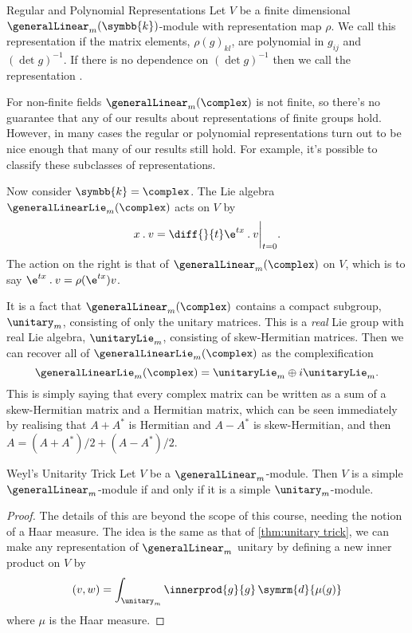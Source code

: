 \documentclass[fleqn]{NotesClass}
\renewcommand{\field}{\symbb{k}}
\newcommand{\action}{\mathbin{.}}
\renewcommand{\dd}{\,\symrm{d}}
\begin{document}
    \begin{dfn}{Regular and Polynomial Representations}{}
        Let \(V\) be a finite dimensional \(\generalLinear_m(\field)\)-module with representation map \(\rho\).
        We call this representation  if the matrix elements, \(\rho(g)_{kl}\), are polynomial in \(g_{ij}\) and \((\det g)^{-1}\).
        If there is no dependence on \((\det g)^{-1}\) then we call the representation .
    \end{dfn}
    
    For non-finite fields \(\generalLinear_m(\complex)\) is not finite, so there's no guarantee that any of our results about representations of finite groups hold.
    However, in many cases the regular or polynomial representations turn out to be nice enough that many of our results still hold.
    For example, it's possible to classify these subclasses of representations.
    
    Now consider \(\field = \complex\).
    The Lie algebra \(\generalLinearLie_m(\complex)\) acts on \(V\) by
    \begin{equation}
        x \action v = \diff{}{t} \e^{tx} \action v \bigg|_{t = 0}.
    \end{equation}
    The action on the right is that of \(\generalLinear_m(\complex)\) on \(V\), which is to say \(\e^{tx} \action v = \rho(\e^{tx})v\).
    
    It is a fact that \(\generalLinear_m(\complex)\) contains a compact subgroup, \(\unitary_m\), consisting of only the unitary matrices.
    This is a \emph{real} Lie group with real Lie algebra, \(\unitaryLie_m\), consisting of skew-Hermitian matrices.
    Then we can recover all of \(\generalLinearLie_m(\complex)\) as the complexification
    \begin{equation}
        \generalLinearLie_m(\complex) = \unitaryLie_m \oplus i \unitaryLie_m.
    \end{equation}
    This is simply saying that every complex matrix can be written as a sum of a skew-Hermitian matrix and a Hermitian matrix, which can be seen immediately by realising that \(A + A^*\) is Hermitian and \(A - A^*\) is skew-Hermitian, and then \(A = (A + A^*)/2 + (A - A^*)/2\).
    
    \begin{prp}{Weyl's Unitarity Trick}{}
        Let \(V\) be a \(\generalLinear_m\)-module.
        Then \(V\) is a simple \(\generalLinear_m\)-module if and only if it is a simple \(\unitary_m\)-module.
        \begin{proof}
            The details of this are beyond the scope of this course, needing the notion of a Haar measure.
            The idea is the same as that of \cref{thm:unitary trick}, we can make any representation of \(\generalLinear_m\) unitary by defining a new inner product on \(V\) by
            \begin{equation}
                (v, w) = \int_{\unitary_m} \innerprod{g}{g} \dd{\mu(g)}
            \end{equation}
            where \(\mu\) is the Haar measure.
        \end{proof}
    \end{prp}
    
\end{document}
